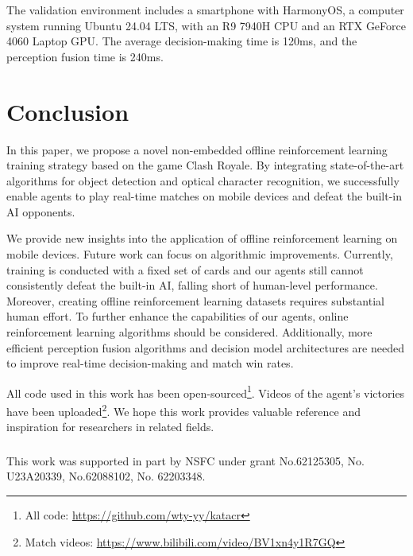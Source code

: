 \documentclass[runningheads]{llncs}
\newcounter{algorithm}
\begin{document}
\noindent The validation environment includes a smartphone with HarmonyOS,
a computer system running Ubuntu 24.04 LTS, with an R9 7940H CPU and an RTX GeForce 4060 Laptop GPU.
The average decision-making time is 120ms, and the perception fusion time is 240ms.


\section{Conclusion}

In this paper, we propose a novel non-embedded offline reinforcement learning training strategy based on the game Clash Royale.
By integrating state-of-the-art algorithms for object detection and optical character recognition,
we successfully enable agents to play real-time matches on mobile devices and defeat the built-in AI opponents.

We provide new insights into the application of offline reinforcement learning on mobile devices.
Future work can focus on algorithmic improvements. Currently,
training is conducted with a fixed set of cards and our agents still cannot consistently defeat the built-in AI,
falling short of human-level performance. Moreover,
creating offline reinforcement learning datasets requires substantial human effort.
To further enhance the capabilities of our agents, online reinforcement learning algorithms should be considered.
Additionally, more efficient perception fusion algorithms and decision model architectures are needed to improve real-time decision-making and match win rates.

All code used in this work has been open-sourced\footnote{All code: \url{https://github.com/wty-yy/katacr}}.
Videos of the agent's victories have been uploaded\footnote{Match videos: \url{https://www.bilibili.com/video/BV1xn4y1R7GQ}}.
We hope this work provides valuable reference and inspiration for researchers in related fields.

\begin{credits}
\subsubsection{\ackname} This work was supported in part by NSFC under grant No.62125305, No. U23A20339, No.62088102,
No. 62203348.
\end{credits}



\end{document}

